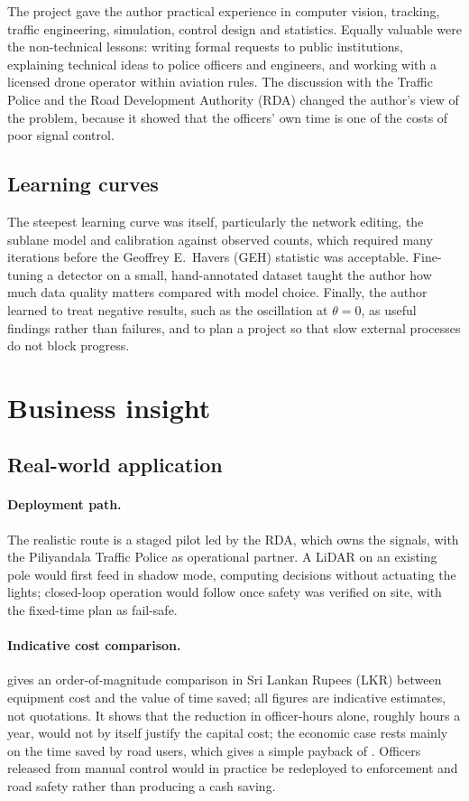 The project gave the author practical experience in computer vision, tracking, traffic engineering, simulation, control design and statistics. Equally valuable were the non-technical lessons: writing formal requests to public institutions, explaining technical ideas to police officers and engineers, and working with a licensed drone operator within aviation rules. The discussion with the Traffic Police and the Road Development Authority (RDA) changed the author's view of the problem, because it showed that the officers' own time is one of the costs of poor signal control.

\subsection{Learning curves}

The steepest learning curve was \sumo{} itself, particularly the network editing, the sublane model and calibration against observed counts, which required many iterations before the Geoffrey E.\ Havers (GEH) statistic was acceptable. Fine-tuning a detector on a small, hand-annotated dataset taught the author how much data quality matters compared with model choice. Finally, the author learned to treat negative results, such as the oscillation at $\theta=0$, as useful findings rather than failures, and to plan a project so that slow external processes do not block progress.

\section{Business insight}

\subsection{Real-world application}

\paragraph{Deployment path.} The realistic route is a staged pilot led by the RDA, which owns the signals, with the Piliyandala Traffic Police as operational partner. A LiDAR on an existing pole would first feed \prism{} in shadow mode, computing decisions without actuating the lights; closed-loop operation would follow once safety was verified on site, with the fixed-time plan as fail-safe.

\paragraph{Indicative cost comparison.}  gives an order-of-magnitude comparison in Sri Lankan Rupees (LKR) between equipment cost and the value of time saved; all figures are indicative estimates, not quotations. It shows that the reduction in officer-hours alone, roughly  hours a year, would not by itself justify the capital cost; the economic case rests mainly on the time saved by road users, which gives a simple payback of . Officers released from manual control would in practice be redeployed to enforcement and road safety rather than producing a cash saving.

